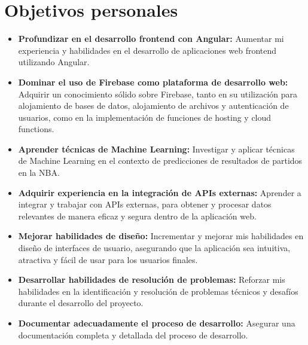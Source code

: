 \section{Objetivos personales}
\begin{itemize}
\tightlist
    \item
        \textbf{Profundizar en el desarrollo frontend con Angular:} Aumentar mi experiencia y habilidades en el desarrollo de aplicaciones web frontend utilizando Angular.
    \item 
        \textbf{Dominar el uso de Firebase como plataforma de desarrollo web:} Adquirir un conocimiento sólido sobre Firebase, tanto en su utilización para alojamiento de bases de datos, alojamiento de archivos y autenticación de usuarios, como en la implementación de funciones de hosting y cloud functions. 
    \item 
        \textbf{Aprender técnicas de Machine Learning:} Investigar y aplicar técnicas de Machine Learning en el contexto de predicciones de resultados de partidos en la NBA.
    \item 
        \textbf{Adquirir experiencia en la integración de APIs externas:} Aprender a integrar y trabajar con APIs externas, para obtener y procesar datos relevantes de manera eficaz y segura dentro de la aplicación web.
    \item 
        \textbf{Mejorar habilidades de diseño:} Incrementar y mejorar mis habilidades en diseño de interfaces de usuario, asegurando que la aplicación sea intuitiva, atractiva y fácil de usar para los usuarios finales.
    \item 
        \textbf{Desarrollar habilidades de resolución de problemas:} Reforzar mis habilidades en la identificación y resolución de problemas técnicos y desafíos durante el desarrollo del proyecto.
    \item 
        \textbf{Documentar adecuadamente el proceso de desarrollo:} Asegurar una documentación completa y detallada del proceso de desarrollo.
\end{itemize}